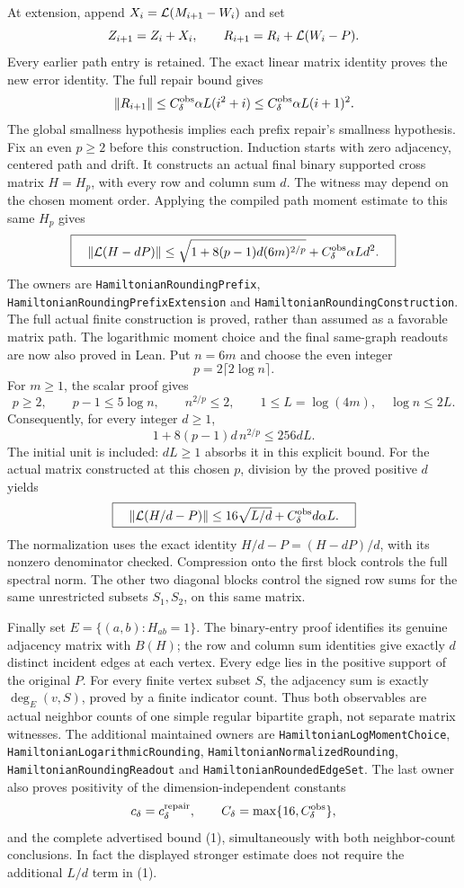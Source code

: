 At extension, append \(X_i={\cal L}(M_{i+1}-W_i)\) and set
\[
 Z_{i+1}=Z_i+X_i,\qquad
 R_{i+1}=R_i+{\cal L}(W_i-P).
\]
Every earlier path entry is retained.
The exact linear matrix identity proves the new error identity.
The full repair bound gives
\[
 \|R_{i+1}\|
 \leq C_\delta^{\rm obs}\alpha L(i^2+i)
 \leq C_\delta^{\rm obs}\alpha L(i+1)^2.
\]
The global smallness hypothesis implies each prefix repair's
smallness hypothesis.
Fix an even \(p\geq2\) before this construction.
Induction starts with zero adjacency, centered path and drift.
It constructs an actual final binary supported cross matrix
\(H=H_p\), with every row and column sum \(d\).
The witness may depend on the chosen moment order.
Applying the compiled path moment estimate to this same \(H_p\)
gives
\[
 \boxed{\quad
 \|{\cal L}(H-dP)\|
 \leq\sqrt{1+8(p-1)d(6m)^{2/p}}
       +C_\delta^{\rm obs}\alpha Ld^2.
 \quad}
\]
The owners are \texttt{HamiltonianRoundingPrefix},
\texttt{HamiltonianRoundingPrefixExtension} and
\texttt{HamiltonianRoundingConstruction}.
The full actual finite construction is proved, rather than assumed
as a favorable matrix path.
The logarithmic moment choice and the final same-graph readouts are
now also proved in Lean.
Put \(n=6m\) and choose the even integer
\[
 p=2\lceil2\log n\rceil.
\]
For \(m\geq1\), the scalar proof gives
\[
 p\geq2,\qquad p-1\leq5\log n,\qquad
 n^{2/p}\leq2,\qquad
 1\leq L=\log(4m),\quad \log n\leq2L.
\]
Consequently, for every integer \(d\geq1\),
\[
 1+8(p-1)d\,n^{2/p}\leq256dL.
\]
The initial unit is included: \(dL\geq1\) absorbs it in this
explicit bound.
For the actual matrix constructed at this chosen \(p\), division
by the proved positive \(d\) yields
\[
 \boxed{\quad
 \|{\cal L}(H/d-P)\|
 \leq16\sqrt{L/d}+C_\delta^{\rm obs}d\alpha L.
 \quad}
\]
The normalization uses the exact identity
\(H/d-P=(H-dP)/d\), with its nonzero denominator checked.
Compression onto the first block controls the full spectral norm.
The other two diagonal blocks control the signed row sums for the
same unrestricted subsets \(S_1,S_2\), on this same matrix.

Finally set \(E=\{(a,b):H_{ab}=1\}\).
The binary-entry proof identifies its genuine adjacency matrix
with \(B(H)\); the row and column sum identities give exactly
\(d\) distinct incident edges at each vertex.
Every edge lies in the positive support of the original \(P\).
For every finite vertex subset \(S\), the adjacency sum is exactly
\(\deg_E(v,S)\), proved by a finite indicator count.
Thus both observables are actual neighbor counts of one simple
regular bipartite graph, not separate matrix witnesses.
The additional maintained owners are
\texttt{HamiltonianLogMomentChoice},
\texttt{HamiltonianLogarithmicRounding},
\texttt{HamiltonianNormalizedRounding},
\texttt{HamiltonianRoundingReadout} and
\texttt{HamiltonianRoundedEdgeSet}.
The last owner also proves positivity of the dimension-independent
constants
\[
 c_\delta=c_\delta^{\rm repair},\qquad
 C_\delta=\max\{16,C_\delta^{\rm obs}\},
\]
and the complete advertised bound (1), simultaneously with both
neighbor-count conclusions.
In fact the displayed stronger estimate does not require the
additional \(L/d\) term in (1).

